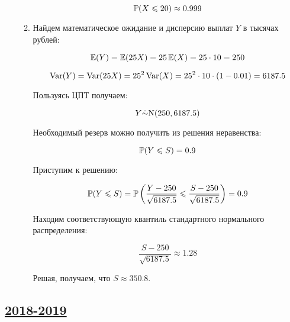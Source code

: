 \begin{enumerate}
\begin{enumerate}
\[
	\P(X\leq 20) \approx 0.999
\]

\item Найдем математическое ожидание и дисперсию выплат $Y$ в тысячах рублей:

\[
	\E(Y)=\E(25 X)=25\E(X)=25 \cdot 10=250
\]

\[
	\Var(Y)=\Var(25 X)=25^2 \Var(X) = 25^2\cdot 10 \cdot (1-0.01) = 6187.5
\]

Пользуясь ЦПТ получаем:

\[
	Y\dot\sim \cN(250, 6187.5)
\]

Необходимый резерв можно получить из решения неравенства:

\[
	\P(Y\leq S)=0.9
\]

Приступим к решению:

\[
	\P(Y\leq S)=\P\left(\frac{Y - 250}{\sqrt{6187.5}} \leq \frac{S-250}{\sqrt{6187.5}}\right)=0.9
\]

Находим соответствующую квантиль стандартного нормального распределения:

\[
	\frac{S-250}{\sqrt{6187.5}}\approx 1.28
\]

Решая, получаем, что $S \approx 350.8$.

\end{enumerate}

\end{enumerate}




\subsection[2018-2019]{\hyperref[sec:kr_02_2018_2019]{2018-2019}}
\label{sec:sol_kr_02_2018_2019}

